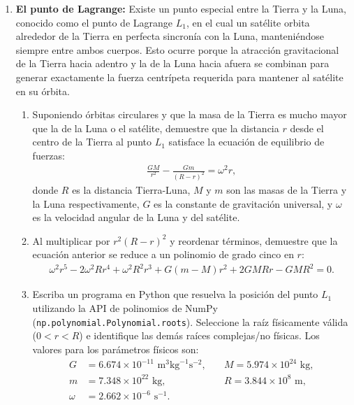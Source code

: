 \documentclass[12pt]{article}
\begin{document}
\begin{problemas}[]
\begin{enumerate}[leftmargin=*]
\begin{enumerate}[label=\alph*)]
   \item Utilizando las funciones integradas de álgebra lineal de NumPy 
   (\lstinline|np.roots| o \lstinline|np.polynomial.Polynomial.roots|) 
   escriba un programa en Python para encontrar las posiciones de 
   las seis raíces y muestre sus residuos.
\end{enumerate}

\item \textbf{El punto de Lagrange:}
Existe un punto especial entre la Tierra y la Luna, conocido 
como el punto de Lagrange $L_1$, en el cual un satélite orbita alrededor 
de la Tierra en perfecta sincronía con la Luna, manteniéndose 
siempre entre ambos cuerpos. Esto ocurre porque la atracción gravitacional 
de la Tierra hacia adentro y la de la Luna hacia afuera se combinan para 
generar exactamente la fuerza centrípeta requerida para mantener al satélite
en su órbita.

\begin{enumerate}[label=\alph*)]
   \item Suponiendo órbitas circulares y que la masa de la Tierra 
   es mucho mayor que la de la Luna o el satélite, demuestre que la distancia 
   $r$ desde el centro de la Tierra al punto $L_1$ satisface la ecuación de 
   equilibrio de fuerzas:
   \begin{align*}
      \frac{GM}{r^2} - \frac{Gm}{(R - r)^2} = \omega^2 r,
   \end{align*}
   donde $R$ es la distancia Tierra-Luna, $M$ y $m$ son las masas de la Tierra y
   la Luna respectivamente, $G$ es la constante de gravitación universal, 
   y $\omega$ es la velocidad angular de la Luna y del satélite.

   \item Al multiplicar por $r^2(R-r)^2$ y reordenar términos, 
   demuestre que la ecuación anterior se reduce a un polinomio de grado 
   cinco en $r$:
   \begin{align*}
      \omega^2 r^5 - 2\omega^2 R r^4 + \omega^2 R^2 r^3 + G(m - M) r^2 + 2 G M R r - G M R^2 = 0.
   \end{align*}

   \item Escriba un programa en Python que resuelva la posición del punto $L_1$ 
   utilizando la API de polinomios de NumPy 
   (\lstinline|np.polynomial.Polynomial.roots|). 
   Seleccione la raíz físicamente válida ($0 < r < R$) e 
   identifique las demás raíces complejas/no físicas.
   Los valores para los parámetros físicos son:
   \begin{align*}
      G &= 6.674 \times 10^{-11} \text{ m}^3 \text{kg}^{-1} \text{s}^{-2}, \quad &M = 5.974 \times 10^{24} \text{ kg}, \\
      m &= 7.348 \times 10^{22} \text{ kg}, \quad &R = 3.844 \times 10^8 \text{ m}, \\
      \omega &= 2.662 \times 10^{-6} \text{ s}^{-1}.
   \end{align*}


\end{enumerate}
\end{enumerate}
\end{problemas}
\end{document}
